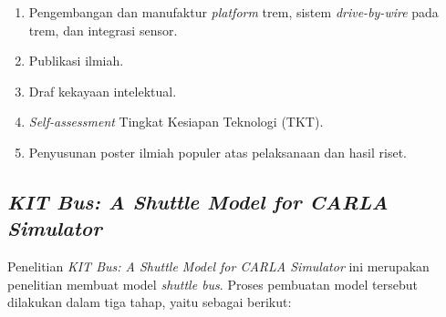 \begin{enumerate}
    \item Pengembangan dan manufaktur \textit{platform} trem, sistem
    \textit{drive-by-wire} pada trem, dan integrasi sensor.

    \item Publikasi ilmiah.
    \item Draf kekayaan intelektual.
    \item \textit{Self-assessment} Tingkat Kesiapan Teknologi (TKT).
    \item Penyusunan poster ilmiah populer atas pelaksanaan dan hasil riset.

\end{enumerate}

\subsection{\textit{KIT Bus: A Shuttle Model for CARLA Simulator} \parencite{related-work-xiang}}
\label{subsec:kitbus}

Penelitian \textit{KIT Bus: A Shuttle Model for CARLA Simulator} ini merupakan
penelitian membuat model \textit{shuttle bus}. Proses pembuatan model tersebut
dilakukan dalam tiga tahap, yaitu sebagai berikut:

